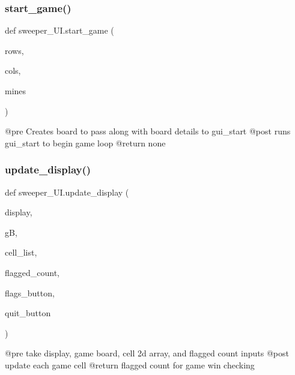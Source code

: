 \subsubsection{\texorpdfstring{start\+\_\+game()}{start\_game()}}
{\footnotesize\ttfamily def sweeper\+\_\+\+U\+I.\+start\+\_\+game (\begin{DoxyParamCaption}\item[{}]{rows,  }\item[{}]{cols,  }\item[{}]{mines }\end{DoxyParamCaption})}

\begin{DoxyVerb}@pre Creates board to pass along with board details to gui_start
@post runs gui_start to begin game loop
@return none
\end{DoxyVerb}
 \mbox{\label{namespacesweeper___u_i_ac5f95a0e13b131052e1fbe163a142ff5}} 
\subsubsection{\texorpdfstring{update\+\_\+display()}{update\_display()}}
{\footnotesize\ttfamily def sweeper\+\_\+\+U\+I.\+update\+\_\+display (\begin{DoxyParamCaption}\item[{}]{display,  }\item[{}]{gB,  }\item[{}]{cell\+\_\+list,  }\item[{}]{flagged\+\_\+count,  }\item[{}]{flags\+\_\+button,  }\item[{}]{quit\+\_\+button }\end{DoxyParamCaption})}

\begin{DoxyVerb}@pre take display, game board, cell 2d array, and flagged count inputs
@post update each game cell
@return flagged count for game win checking
\end{DoxyVerb}
 \mbox{\label{namespacesweeper___u_i_a892a833cb13683da856095b3f50e5d0c}} 

